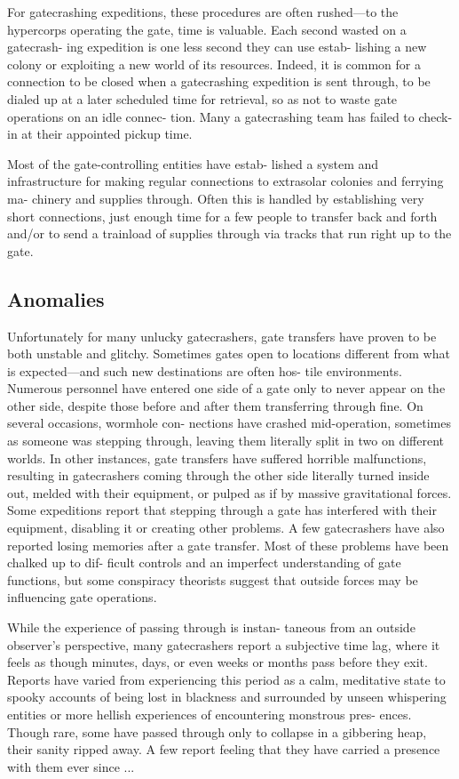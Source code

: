 For gatecrashing expeditions, these procedures are 
often rushed—to the hypercorps operating the gate, 
time is valuable. Each second wasted on a gatecrash-
ing expedition is one less second they can use estab-
lishing a new colony or exploiting a new world of its 
resources. Indeed, it is common for a connection to be 
closed when a gatecrashing expedition is sent through, 
to be dialed up at a later scheduled time for retrieval, 
so as not to waste gate operations on an idle connec-
tion. Many a gatecrashing team has failed to check-in 
at their appointed pickup time.

Most of the gate-controlling entities have estab-
lished a system and infrastructure for making regular 
connections to extrasolar colonies and ferrying ma-
chinery and supplies through. Often this is handled by 
establishing very short connections, just enough time 
for a few people to transfer back and forth and/or to 
send a trainload of supplies through via tracks that 
run right up to the gate.

\subsection{Anomalies}

Unfortunately for many unlucky gatecrashers, gate 
transfers have proven to be both unstable and glitchy. 
Sometimes gates open to locations different from what 
is expected—and such new destinations are often hos-
tile environments. Numerous personnel have entered 
one side of a gate only to never appear on the other 
side, despite those before and after them transferring 
through fine. On several occasions, wormhole con-
nections have crashed mid-operation, sometimes as 
someone was stepping through, leaving them literally 
split in two on different worlds. In other instances, 
gate transfers have suffered horrible malfunctions, 
resulting in gatecrashers coming through the other 
side literally turned inside out, melded with their 
equipment, or pulped as if by massive gravitational 
forces. Some expeditions report that stepping through 
a gate has interfered with their equipment, disabling 
it or creating other problems. A few gatecrashers have 
also reported losing memories after a gate transfer. 
Most of these problems have been chalked up to dif-
ficult controls and an imperfect understanding of gate 
functions, but some conspiracy theorists suggest that 
outside forces may be influencing gate operations. 

While the experience of passing through is instan-
taneous from an outside observer's perspective, many 
gatecrashers report a subjective time lag, where it feels 
as though minutes, days, or even weeks or months 
pass before they exit. Reports have varied from 
experiencing this period as a calm, meditative state 
to spooky accounts of being lost in blackness and 
surrounded by unseen whispering entities or more 
hellish experiences of encountering monstrous pres-
ences. Though rare, some have passed through only to 
collapse in a gibbering heap, their sanity ripped away. 
A few report feeling that they have carried a presence 
with them ever since ...

